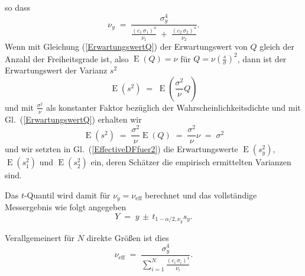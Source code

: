 so dass
\begin{equation}
\nu_y \; = \; \frac{\sigma_y^4}{\frac{(c_1 \, \sigma_1)^4}{\nu_1} 
 \; + \; \frac{(c_2 \, \sigma_2)^4}{\nu_2}} .
\label{EffectiveDFfuer2}
\end{equation}
Wenn mit Gleichung (\ref{ErwartungswertQ}) der Erwartungswert 
von $Q$ gleich der Anzahl der Freiheitsgrade ist, also $\operatorname{E}(Q) = \nu$
für $Q = \nu \left(\frac{s}{\sigma}\right)^2$, dann ist der Erwartungswert der
Varianz $s^2$
\begin{equation}
\operatorname{E}(s^2) \; = \; \operatorname{E}(\frac{\sigma^2}{\nu} Q)
\end{equation}
und mit $\frac{\sigma^2}{\nu}$ als konstanter Faktor bezüglich der Wahrscheinlichkeitsdichte
und mit Gl.~(\ref{ErwartungswertQ}) erhalten wir
\begin{equation}
\operatorname{E}(s^2) \; = \; \frac{\sigma^2}{\nu}  \operatorname{E}(Q) \; = \; 
\frac{\sigma^2}{\nu} \nu \; = \; \sigma^2
\end{equation}
und wir setzten in Gl.~(\ref{EffectiveDFfuer2}) die Erwartungswerte
$\operatorname{E}(s_y^2)$, $\operatorname{E}(s_1^2)$ und $\operatorname{E}(s_2^2)$ ein,
deren Schätzer die empirisch ermittelten Varianzen sind.

Das $t$-Quantil wird damit für $\nu_y = \nu_\mathrm{eff}$ berechnet und das vollständige Messergebnis wie folgt
angegeben
\begin{equation}
Y \; = \; y \, \pm \, t_{1-\alpha/2,\nu_y} s_y .
\label{vollstaendigesSatterthwaite}
\end{equation}


Verallgemeinert für $N$ direkte Größen ist dies
\begin{equation}
\nu_\mathrm{eff} \; = \; \frac{\sigma_y^4}{\sum\limits_{i=1}^N \frac{(c_i \, \sigma_i)^4}{\nu_i}} .
\label{EffectiveDFviele}
\end{equation}


